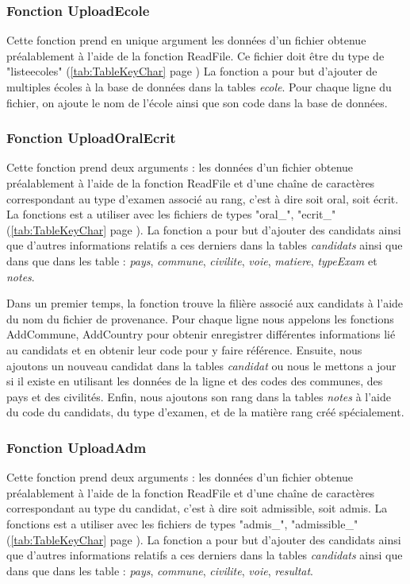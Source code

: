 \subsubsection{Fonction UploadEcole}


Cette fonction prend en unique argument les données d'un fichier obtenue préalablement à l'aide de la fonction ReadFile. Ce fichier doit être du type de "listeecoles" (\ref{tab:TableKeyChar} page \pageref{tab:TableKeyChar})
La fonction a pour but d'ajouter de multiples écoles à la base de données dans la tables \textit{ecole}.
Pour chaque ligne du fichier, on ajoute le nom de l'école ainsi que son code dans la base de données.

\subsubsection{Fonction UploadOralEcrit}


Cette fonction prend deux arguments : les données d'un fichier obtenue préalablement à l'aide de la fonction ReadFile et d'une chaîne de caractères  correspondant au type d'examen associé au rang, c'est à dire soit oral, soit écrit. La fonctions est a utiliser avec les fichiers  de types "oral\_", "ecrit\_" (\ref{tab:TableKeyChar} page \pageref{tab:TableKeyChar}).
La fonction a pour but d'ajouter des candidats ainsi que d'autres informations relatifs a ces derniers dans la tables \textit{candidats} ainsi que dans que dans les table : \textit{pays}, \textit{commune}, \textit{civilite}, \textit{voie}, \textit{matiere}, \textit{typeExam} et \textit{notes}.


Dans un premier temps, la fonction trouve la filière associé aux candidats à l'aide du nom du fichier de provenance.
Pour chaque ligne nous appelons les fonctions AddCommune, AddCountry pour obtenir enregistrer différentes informations lié au candidats et en obtenir leur code pour y faire référence.
Ensuite, nous ajoutons un nouveau candidat dans la tables \textit{candidat} ou nous le mettons a jour si il existe en utilisant les données de la ligne et des codes des communes, des pays et des civilités.
Enfin, nous ajoutons son rang dans la tables \textit{notes} à  l'aide du code du candidats, du type d'examen, et de la matière rang créé spécialement.

\subsubsection{Fonction UploadAdm}


Cette fonction prend deux arguments : les données d'un fichier obtenue préalablement à l'aide de la fonction ReadFile et d'une chaîne de caractères  correspondant au type du candidat, c'est à dire soit admissible, soit admis. La fonctions est a utiliser avec les fichiers  de types "admis\_", "admissible\_" (\ref{tab:TableKeyChar} page \pageref{tab:TableKeyChar}).
La fonction a pour but d'ajouter des candidats ainsi que d'autres informations relatifs a ces derniers dans la tables \textit{candidats} ainsi que dans que dans les table : \textit{pays}, \textit{commune}, \textit{civilite}, \textit{voie}, \textit{resultat}.

